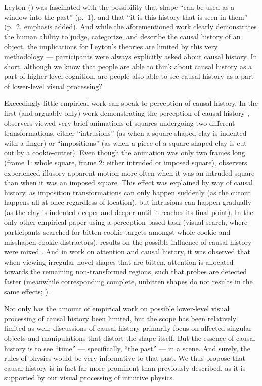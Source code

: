 Leyton (\citeyear{leyton_inferring_1989}) was fascinated with the possibility that shape “can be used as a window into the past” (p.~1), and that “it is this history that is seen in them” (p.~2, emphasis added).  And while the aforementioned work clearly demonstrates the human ability to judge, categorize, and describe the causal history of an object, the implications for Leyton’s theories are limited by this very methodology --- participants were always explicitly asked about causal history.  In short, although we know that people are able to think about causal history as a part of higher-level cognition, are people also able to see causal history as a part of lower-level visual processing? 

Exceedingly little empirical work can speak to perception of causal history.  In the first (and arguably only) work demonstrating the perception of causal history \parencite{chen_perception_2016}, observers viewed very brief animations of squares undergoing two different transformations, either “intrusions” (as when a square-shaped clay is indented with a finger) or “impositions” (as when a piece of a square-shaped clay is cut out by a cookie-cutter).  Even though the animation was only two frames long (frame 1: whole square, frame 2: either intruded or imposed square), observers experienced illusory apparent motion more often when it was an intruded square than when it was an imposed square.  This effect was explained by way of causal history, as imposition transformations can only happen suddenly (as the cutout happens all-at-once regardless of location), but intrusions can happen gradually (as the clay is indented deeper and deeper until it reaches its final point).  In the only other empirical paper using a perception-based task (visual search, where participants searched for bitten cookie targets amongst whole cookie and misshapen cookie distractors), results on the possible influence of causal history were mixed \parencite{brenner_searching_2020}.  And in work on attention and causal history, it was observed that when viewing irregular novel shapes that are bitten, attention is allocated towards the remaining non-transformed regions, such that probes are detected faster (meanwhile corresponding complete, unbitten shapes do not results in the same effects; \cite{chen_causal_2021}).

Not only has the amount of empirical work on possible lower-level visual processing of causal history been limited, but the scope has been relatively limited as well: discussions of causal history primarily focus on affected singular objects and manipulations that distort the shape itself.  But the essence of causal history is to see “time” --- specifically, “the past” --- in a scene.  And surely, the rules of physics would be very informative to that past.  We thus propose that causal history is in fact far more prominent than previously described, as it is supported by our visual processing of intuitive physics.

